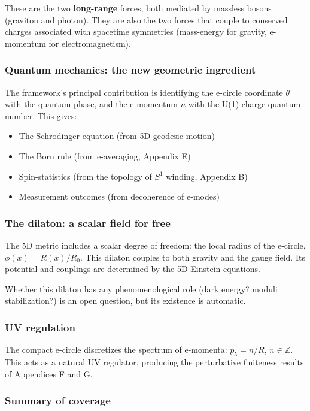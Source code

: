 \documentclass[aps,prd,preprint,superscriptaddress,longbibliography,floatfix]{revtex4-2}
\theoremstyle{remark}
\begin{document}
These are the two \textbf{long-range} forces, both mediated by massless bosons (graviton and photon). They are also the two forces that couple to conserved charges associated with spacetime symmetries (mass-energy for gravity, e-momentum for electromagnetism).


\subsubsection{Quantum mechanics: the new geometric ingredient}

The framework's principal contribution is identifying the e-circle coordinate $\theta$ with the quantum phase, and the e-momentum $n$ with the U(1) charge quantum number. This gives:


\begin{itemize}
  \item The Schrodinger equation (from 5D geodesic motion)
  \item The Born rule (from e-averaging, Appendix E)
  \item Spin-statistics (from the topology of $S^1$ winding, Appendix B)
  \item Measurement outcomes (from decoherence of e-modes)
\end{itemize}


\subsubsection{The dilaton: a scalar field for free}

The 5D metric includes a scalar degree of freedom: the local radius of the e-circle, $\phi(x) = R(x) / R_0$. This dilaton couples to both gravity and the gauge field. Its potential and couplings are determined by the 5D Einstein equations.

Whether this dilaton has any phenomenological role (dark energy? moduli stabilization?) is an open question, but its existence is automatic.


\subsubsection{UV regulation}

The compact e-circle discretizes the spectrum of e-momenta: $p_5 = n / R$, $n \in \mathbb{Z}$. This acts as a natural UV regulator, producing the perturbative finiteness results of Appendices F and G.


\subsubsection{Summary of coverage}
\end{document}
